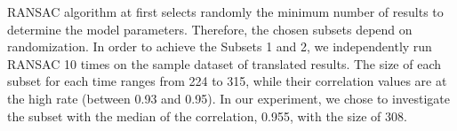 %
RANSAC algorithm at first selects randomly the minimum number of
results to determine the model parameters. Therefore, the chosen
subsets depend on randomization. In order to achieve the Subsets 1 and
2, we independently run RANSAC 10 times on the sample dataset of
translated results.
%
The size of each subset for each time ranges from 224 to 315, while their correlation values are at the high rate (between 0.93 and 0.95).
%
In our experiment, we chose to investigate the
subset with the median of the correlation, 0.955, with the
size of 308.
%



%

